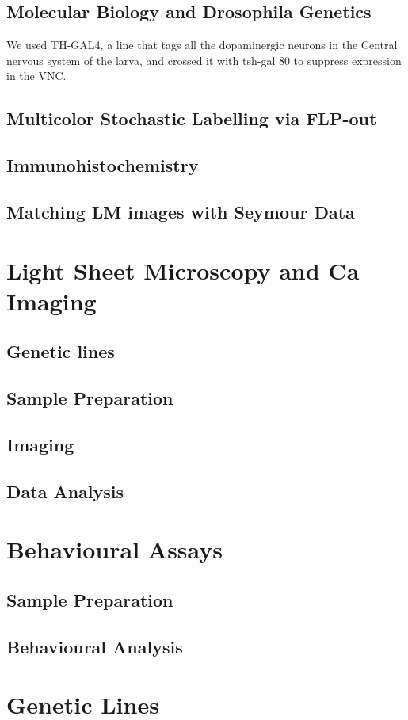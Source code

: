 \subsection{Molecular Biology and Drosophila Genetics}
We used TH-GAL4, a line that tags all the dopaminergic neurons in the Central nervous system of the larva, and crossed it with tsh-gal 80 to suppress expression in the VNC. 

\subsection{Multicolor Stochastic Labelling via FLP-out} 





\subsection{Immunohistochemistry}
\subsection{Matching LM images with Seymour Data} %
\newpage



\section{Light Sheet Microscopy and Ca Imaging}
\subsection{Genetic lines} %
\subsection{Sample Preparation}
\subsection{Imaging}
\subsection{Data Analysis}



\section{Behavioural Assays}
\subsection{Sample Preparation}
\subsection{Behavioural Analysis}


\section{Genetic Lines}








